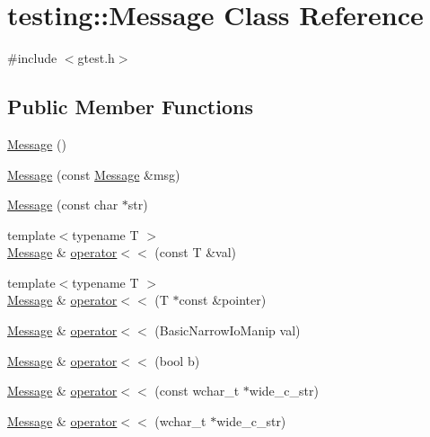 \hypertarget{classtesting_1_1_message}{\section{testing\-:\-:Message Class Reference}
\label{classtesting_1_1_message}
}


{\ttfamily \#include $<$gtest.\-h$>$}

\subsection*{Public Member Functions}
\begin{DoxyCompactItemize}
\item 
\hyperlink{classtesting_1_1_message_af5ba7216630df9845f18feb64b1a5383}{Message} ()
\item 
\hyperlink{classtesting_1_1_message_ac126e24804817a053bebba0920d94a11}{Message} (const \hyperlink{classtesting_1_1_message}{Message} \&msg)
\item 
\hyperlink{classtesting_1_1_message_a9de694ca239486809fc99fbbea8ac21d}{Message} (const char $\ast$str)
\item 
{\footnotesize template$<$typename T $>$ }\\\hyperlink{classtesting_1_1_message}{Message} \& \hyperlink{classtesting_1_1_message_a2e0e71be52d54c20a75a55fca812721f}{operator$<$$<$} (const T \&val)
\item 
{\footnotesize template$<$typename T $>$ }\\\hyperlink{classtesting_1_1_message}{Message} \& \hyperlink{classtesting_1_1_message_aa3ab685879958f90d2d8cd5b68d10c34}{operator$<$$<$} (T $\ast$const \&pointer)
\item 
\hyperlink{classtesting_1_1_message}{Message} \& \hyperlink{classtesting_1_1_message_a3a71a1c1c8ea52de5852d75483d41453}{operator$<$$<$} (Basic\-Narrow\-Io\-Manip val)
\item 
\hyperlink{classtesting_1_1_message}{Message} \& \hyperlink{classtesting_1_1_message_a3e1e04f23b1bdfe18adfd59928296346}{operator$<$$<$} (bool b)
\item 
\hyperlink{classtesting_1_1_message}{Message} \& \hyperlink{classtesting_1_1_message_ac0db9c22535b28bc863bfd0a1fdf7e14}{operator$<$$<$} (const wchar\-\_\-t $\ast$wide\-\_\-c\-\_\-str)
\item 
\hyperlink{classtesting_1_1_message}{Message} \& \hyperlink{classtesting_1_1_message_ac1d3a041ac4bb9c929ee746b31a13d6a}{operator$<$$<$} (wchar\-\_\-t $\ast$wide\-\_\-c\-\_\-str)

\end{DoxyCompactItemize}
